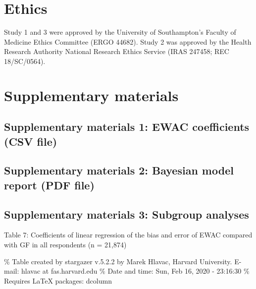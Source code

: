 \documentclass[]{article}
\begin{document}
\hypertarget{ethics}{%
\section{Ethics}\label{ethics}}

Study 1 and 3 were approved by the University of Southampton's Faculty
of Medicine Ethics Committee (ERGO 44682). Study 2 was approved by the
Health Research Authority National Research Ethics Service (IRAS 247458;
REC 18/SC/0564).

\hypertarget{supplementary-materials}{%
\section{Supplementary materials}\label{supplementary-materials}}

\hypertarget{supplementary-materials-1-ewac-coefficients-csv-file}{%
\subsection{Supplementary materials 1: EWAC coefficients (CSV
file)}\label{supplementary-materials-1-ewac-coefficients-csv-file}}

\hypertarget{supplementary-materials-2-bayesian-model-report-pdf-file}{%
\subsection{Supplementary materials 2: Bayesian model report (PDF
file)}\label{supplementary-materials-2-bayesian-model-report-pdf-file}}

\hypertarget{supplementary-materials-3-subgroup-analyses}{%
\subsection{Supplementary materials 3: Subgroup
analyses}\label{supplementary-materials-3-subgroup-analyses}}

Table 7: Coefficients of linear regression of the bias and error of EWAC
compared with GF in all respondents (n = 21,874)

\% Table created by stargazer v.5.2.2 by Marek Hlavac, Harvard
University. E-mail: hlavac at fas.harvard.edu \% Date and time: Sun, Feb
16, 2020 - 23:16:30 \% Requires LaTeX packages: dcolumn
\end{document}
